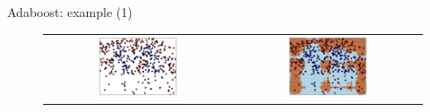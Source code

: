 \begin{frame}{Adaboost: example (1)}
\begin{figure}
\begin{tabular}{cc}
\includegraphics[width=0.45\textwidth]{img/boosting/1_data.pdf}&
\includegraphics[width=0.45\textwidth]{img/boosting/1_boundary.pdf}
\end{tabular}
\end{figure}
\end{frame}
